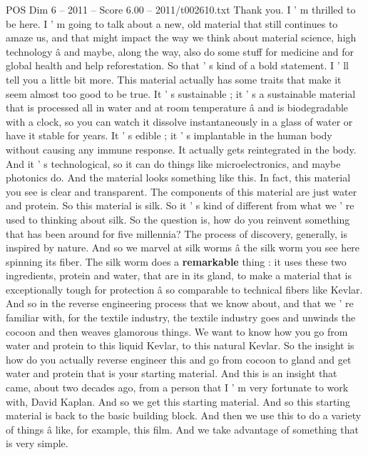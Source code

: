 \begin{textsample}{POS Dim 6 – 2011 – Score 6.00 – 2011/t002610.txt}  \label{ex:f6_pos_032}
Thank you.
I ' m thrilled to be here.
I ' m going to talk about a new, old material that still continues to amaze us, and that might impact the way we think about material science, high technology â and maybe, along the way, also do some stuff for medicine and for global health and help reforestation.
So that ' s kind of a bold statement.
I ' ll tell you a little bit more.
This material actually has some traits that make it seem almost too good to be true.
It ' s sustainable ; it ' s a sustainable material that is processed all in water and at room temperature â and is biodegradable with a clock, so you can watch it dissolve instantaneously in a glass of water or have it stable for years.
It ' s edible ; it ' s implantable in the human body without causing any immune response.
It actually gets reintegrated in the body.
And it ' s technological, so it can do things like microelectronics, and maybe photonics do.
And the material looks something like this.
In fact, this material you see is clear and transparent.
The components of this material are just water and protein.
So this material is silk.
So it ' s kind of different from what we ' re used to thinking about silk.
So the question is, how do you reinvent something that has been around for five millennia?
The process of discovery, generally, is inspired by nature.
And so we marvel at silk worms â the silk worm you see here spinning its fiber.
The silk worm does a \textbf{remarkable} thing : it uses these two ingredients, protein and water, that are in its gland, to make a material that is exceptionally tough for protection â so comparable to technical fibers like Kevlar.
And so in the reverse engineering process that we know about, and that we ' re familiar with, for the textile industry, the textile industry goes and unwinds the cocoon and then weaves glamorous things.
We want to know how you go from water and protein to this liquid Kevlar, to this natural Kevlar.
So the insight is how do you actually reverse engineer this and go from cocoon to gland and get water and protein that is your starting material.
And this is an insight that came, about two decades ago, from a person that I ' m very fortunate to work with, David Kaplan.
And so we get this starting material.
And so this starting material is back to the basic building block.
And then we use this to do a variety of things â like, for example, this film.
And we take advantage of something that is very simple.

\end{textsample}

